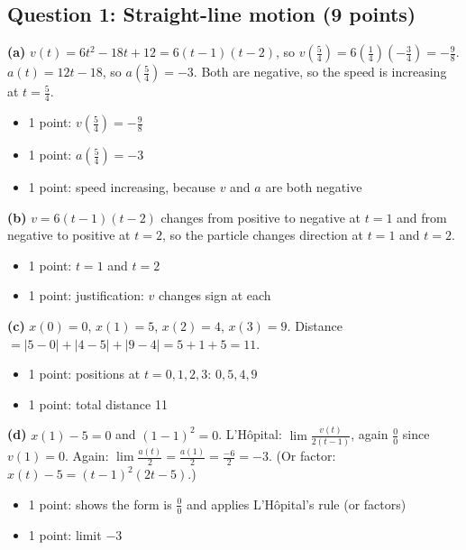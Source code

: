 \documentclass{apcalc}
\begin{document}
\subsection*{Question 1: Straight-line motion (9 points)}
\textbf{(a)} $v(t)=6t^2-18t+12=6(t-1)(t-2)$, so $v(\frac54)=6(\frac14)(-\frac34)=-\frac98$. $a(t)=12t-18$, so $a(\frac54)=-3$. Both are negative, so the speed is increasing at $t=\frac54$.
\begin{itemize}[leftmargin=1.6em,itemsep=0pt]
\item 1 point: $v(\frac54)=-\frac98$
\item 1 point: $a(\frac54)=-3$
\item 1 point: speed increasing, because $v$ and $a$ are both negative
\end{itemize}
\textbf{(b)} $v=6(t-1)(t-2)$ changes from positive to negative at $t=1$ and from negative to positive at $t=2$, so the particle changes direction at $t=1$ and $t=2$.
\begin{itemize}[leftmargin=1.6em,itemsep=0pt]
\item 1 point: $t=1$ and $t=2$
\item 1 point: justification: $v$ changes sign at each
\end{itemize}
\textbf{(c)} $x(0)=0$, $x(1)=5$, $x(2)=4$, $x(3)=9$. Distance $=|5-0|+|4-5|+|9-4|=5+1+5=11$.
\begin{itemize}[leftmargin=1.6em,itemsep=0pt]
\item 1 point: positions at $t=0,1,2,3$: $0,5,4,9$
\item 1 point: total distance 11
\end{itemize}
\textbf{(d)} $x(1)-5=0$ and $(1-1)^2=0$. L'Hôpital: $\lim\frac{v(t)}{2(t-1)}$, again $\frac00$ since $v(1)=0$. Again: $\lim\frac{a(t)}{2}=\frac{a(1)}{2}=\frac{-6}{2}=-3$. (Or factor: $x(t)-5=(t-1)^2(2t-5)$.)
\begin{itemize}[leftmargin=1.6em,itemsep=0pt]
\item 1 point: shows the form is $\frac00$ and applies L'Hôpital's rule (or factors)
\item 1 point: limit $-3$
\end{itemize}
\end{document}
